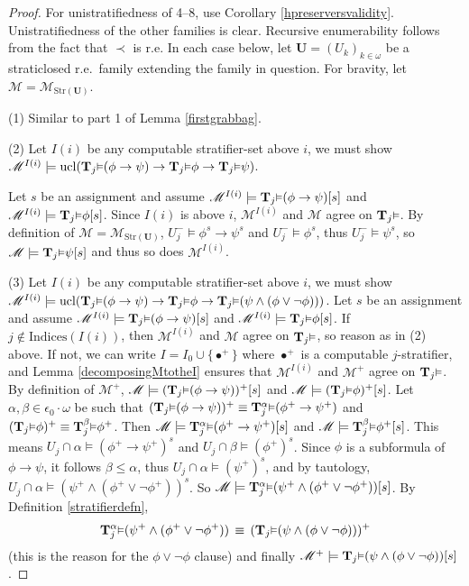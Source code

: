 \documentclass[reqno]{article}
\theoremstyle{definition}
\def\M{\mathscr{M}}
\def\T{\mathbf{T}}
\def\U{\mathbf{U}}
\def\indices{\mathrm{Indices}}
\def\epom{\epsilon_0\cdot\omega}
\renewcommand{\Pr}[1]{\T_{#1}\mbox{\small${\vDash}$}}
\newcommand{\Prr}[2]{\T^{#1}_{#2}\mbox{\small${\vDash}$}}
\newcommand{\ucl}[1]{\mathrm{ucl}(#1)}
\newcommand{\str}[1]{\mathrm{Str}(#1)} \newcommand{\Str}[1]{\str{#1}}
\begin{document}
\begin{proof}
For
unistratifiedness of 4--8,
use Corollary \ref{hpreserversvalidity}.
Unistratifiedness of the other families is clear.
Recursive enumerability follows from the fact that $\prec$
is r.e.
In each
case below, let $\U=(U_k)_{k\in\omega}$ be a straticlosed r.e.~family
extending the family
in question.
For bravity, let $\M=\M_{\str\U}$.

\item
(1) Similar to part 1 of Lemma \ref{firstgrabbag}.

\item
(2) Let $I(i)$ be any computable stratifier-set above $i$, we must show
$\M^{I(i)}\models \ucl{\Pr j(\phi\rightarrow\psi)
\rightarrow\Pr j\phi\rightarrow\Pr j\psi}$.

Let $s$ be an assignment and assume
$\M^{I(i)}\models \Pr j(\phi\rightarrow\psi)[s]$
and $\M^{I(i)}\models\Pr j\phi[s]$.
Since $I(i)$ is above $i$, $\M^{I(i)}$ and $\M$
agree on $\Pr j$.
By definition of $\M=\M_{\str\U}$, $U^-_j\models\phi^s\rightarrow\psi^s$
and $U^-_j\models\phi^s$, thus $U^-_j\models\psi^s$, so
$\M\models \Pr j\psi[s]$ and thus so does $\M^{I(i)}$.

\item
(3) Let $I(i)$ be any computable stratifier-set above $i$,
we must show
$\M^{I(i)}\models \ucl{\Pr j(\phi\rightarrow\psi)\rightarrow \Pr j\phi\rightarrow \Pr j(\psi\wedge(\phi\vee\neg\phi))}$.
Let $s$ be an assignment and assume $\M^{I(i)}\models \Pr j(\phi\rightarrow\psi)[s]$
and $\M^{I(i)}\models\Pr j\phi[s]$.
If $j\not\in\indices(I(i))$, then $\M^{I(i)}$ and $\M$
agree on $\Pr j$, so reason as in (2) above.
If not, we can write $I=I_0\cup\{\bullet^+\}$ where $\bullet^+$ is a
computable $j$-stratifier, and Lemma \ref{decomposingMtotheI} ensures that
$\M^{I(i)}$ and $\M^+$ agree on $\Pr j$.
%
By definition of $\M^+$, $\M\models(\Pr j(\phi\rightarrow\psi))^+[s]$
and $\M\models(\Pr j\phi)^+[s]$.
Let $\alpha,\beta\in\epom$ be such that $(\Pr j(\phi\rightarrow\psi))^+\equiv\Prr\alpha j(\phi^+\rightarrow\psi^+)$
and $(\Pr j\phi)^+\equiv\Prr\beta j\phi^+$.
Then
$\M\models\Prr\alpha j (\phi^+\rightarrow\psi^+)[s]$ and $\M\models\Prr\beta j\phi^+[s]$.
This means $U_j\cap\alpha\models(\phi^+\rightarrow\psi^+)^s$ and $U_j\cap\beta\models(\phi^+)^s$.
Since $\phi$ is a subformula of $\phi\rightarrow\psi$, it follows $\beta\leq\alpha$, thus
$U_j\cap\alpha\models (\psi^+)^s$, and by tautology,
$U_j\cap\alpha\models(\psi^+\wedge(\phi^+\vee\neg\phi^+))^s$.
So $\M\models\Prr\alpha j(\psi^+\wedge(\phi^+\vee\neg\phi^+))[s]$.
By Definition \ref{stratifierdefn},
\[
\Prr\alpha j(\psi^+\wedge(\phi^+\vee\neg\phi^+)) \,\equiv\, (\Pr j(\psi\wedge(\phi\vee\neg\phi)))^+
\]
(this is the reason for the $\phi\vee\neg\phi$ clause)
and finally $\M^+\models \Pr j(\psi\wedge(\phi\vee\neg\phi))[s]$.


\end{proof}
\end{document}
